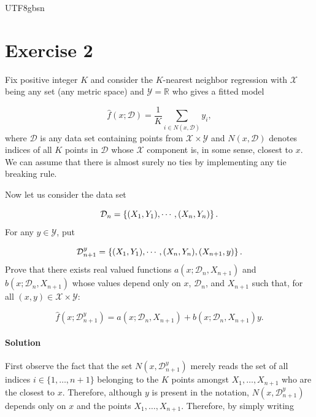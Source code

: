 \documentclass[../../main.tex]{subfiles}
\begin{document}
\begin{CJK*}{UTF8}{gbsn}

\section*{Exercise 2}

Fix positive integer $K$ and
consider the $K$-nearest neighbor regression
with $\mathcal{X}$ being any set (any metric space) and $\mathcal{Y} = \mathbb{R}$
who gives a fitted model

\begin{equation*}
    \hat{f}(x; \mathcal{D})=\frac{1}{K}\sum_{i \in N(x, \mathcal{D})}y_i,
\end{equation*}
where $\mathcal{D}$ is any data set containing points from $\mathcal{X} \times \mathcal{Y}$
and $N(x, \mathcal{D})$ denotes indices of all $K$ points in $\mathcal{D}$
whose $\mathcal{X}$ component is, in some sense, closest to $x$.
We can assume that there is almost surely no ties 
by implementing any tie breaking rule.

Now let us consider the data set

\begin{equation*}
    \mathcal{D}_{n} = \left \{ (X_1, Y_1), \cdots, (X_{n}, Y_{n}) \right \}.
\end{equation*}
For any $y \in \mathcal{Y}$, put

\begin{equation*}
    \mathcal{D}_{n+1}^y = \left \{ (X_1, Y_1), \cdots, (X_{n}, Y_{n}), (X_{n+1}, y) \right \}.
\end{equation*}
Prove that there exists real valued functions $a(x; \mathcal{D}_{n}, X_{n+1})$
and $b(x; \mathcal{D}_{n}, X_{n+1})$
whose values depend only on $x$, $\mathcal{D}_{n}$, and $X_{n+1}$
such that, for all $(x,y) \in \mathcal{X} \times \mathcal{Y}$:

\begin{equation*}
    \hat{f}(x; \mathcal{D}_{n+1}^y)
    = a(x; \mathcal{D}_{n}, X_{n+1}) + b(x; \mathcal{D}_{n}, X_{n+1})y.
\end{equation*}

\paragraph{Solution}
First observe the fact that the set $N(x, \mathcal{D}_{n+1}^y)$
merely reads the set of all indices $i \in \{1, \ldots, n + 1\}$
belonging to the $K$ points amongst $X_1, \ldots, X_{n+1}$
who are the closest to $x$.
Therefore, although $y$ is present in the notation,
$N(x, \mathcal{D}_{n+1}^y)$ depends only on $x$ and the points $X_1, \ldots, X_{n+1}$.
Therefore, by simply writing 


\end{CJK*}
\end{document}
